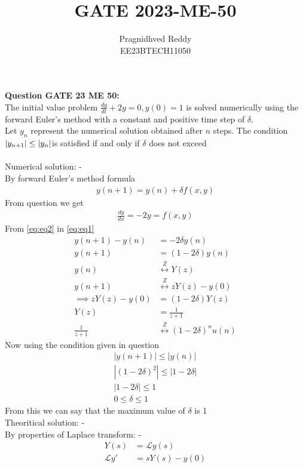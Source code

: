 \documentclass[journal,12pt,twocolumn]{IEEEtran}
\title{GATE 2023-ME-50}
\author{Pragnidhved Reddy\\EE23BTECH11050}
\date{}
\begin{document}
\maketitle
\newpage
\bigskip
\textbf{Question GATE 23 ME 50:}\\
The initial value problem
$\frac{dy}{dt}+2y=0, y(0)=1 $
is solved numerically using the forward Euler's method with a constant and positive time step of $\delta $.\\
Let $y_n$ represent the numerical solution obtained after $n$ steps. The condition $\left\vert y_{n+1}\right\vert \leq \left\vert y_n\right\vert$is satisfied if and only if $\delta$ does not exceed\\
\solution \\
Numerical solution: -\\
By forward Euler's method formula 
\begin{align}
\label{eq:eq1}
    y(n+1)=y(n)+\delta  f(x,y)
\end{align}
From question we get
\begin{align}
\label{eq:eq2}
\frac{dy}{dx}=-2y=f(x,y)
\end{align}
From \eqref{eq:eq2} in \eqref{eq:eq1}
\begin{align}
y(n+1)-y(n)&=-2\delta y(n)\\
y(n+1)&=(1-2\delta)y(n)\\
y(n)&\overset{Z}\longleftrightarrow Y(z)\\
y(n+1)&\overset{Z}\longleftrightarrow zY(z)-y(0)\\
\implies zY(z)-y(0)&=(1-2\delta)Y(z)\\
Y(z)&=\frac{1}{z+1}\\
\frac{1}{z+1}&\overset{Z}\longleftrightarrow (1-2\delta)^{n}u(n)
\end{align}
Now using the condition given in question
\begin{align}
|y(n+1)| \leq |y(n)|\\
|(1-2\delta)^2| \leq |1-2\delta|\\
|1-2\delta| \leq 1 \\
0 \leq \delta \leq 1
\end{align}
From this we can say that the maximum value of $\delta  $ is 1\\
Theoritical solution: -\\
By properties of Laplace transform: -
\begin{align}
\label{eq:eq8}
Y(s)&=\mathcal{L}y(s)\\
\label{eq:eq9}
\mathcal{L}y'&=sY(s)-y(0)
\end{align}
\end{document}
